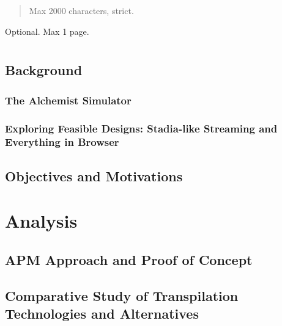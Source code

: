 \documentclass[12pt,a4paper,openright,twoside]{book}
\begin{document}
\frontmatter


\begin{abstract}
Max 2000 characters, strict.
\end{abstract}

\begin{acknowledgements} %
Optional. Max 1 page.
\end{acknowledgements}

\tableofcontents

\listoffigures

\lstlistoflistings

\mainmatter

\chapter{\introductionname}
\label{chap:introduction}
\section{Background}
\label{sec:background}
\subsection{The Alchemist Simulator}
\label{ssec:the-alchemist-simulator}
\subsection{Exploring Feasible Designs: Stadia-like Streaming and Everything in Browser}
\label{ssec:exploring-feasible-designs-stadia-like-streaming-and-everything-in-browser}
\section{Objectives and Motivations}
\label{sec:objectives-and-motivations}
\chapter{Analysis}
\label{chap:analysis}
\section{APM Approach and Proof of Concept}
\label{sec:apm-approach-and-proof-of-concept}
\section{Comparative Study of Transpilation Technologies and Alternatives}
\label{sec:comparative-study-of-transpilation-technologies-and-alternatives}
\end{document}
